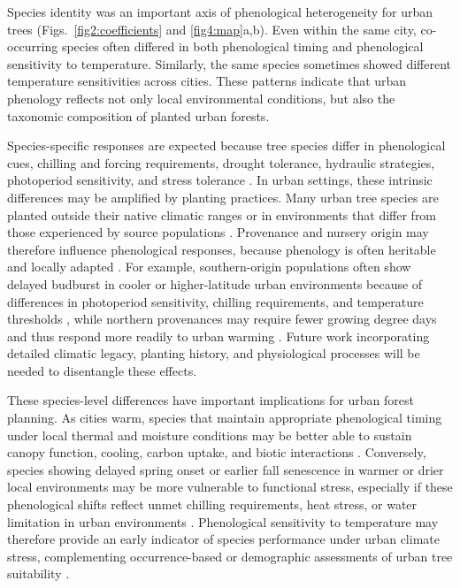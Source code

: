 Species identity was an important axis of phenological heterogeneity for urban trees (Figs.~\ref{fig2:coefficients} and \ref{fig4:map}a,b). Even within the same city, co-occurring species often differed in both phenological timing and phenological sensitivity to temperature. Similarly, the same species sometimes showed different temperature sensitivities across cities. These patterns indicate that urban phenology reflects not only local environmental conditions, but also the taxonomic composition of planted urban forests.

Species-specific responses are expected because tree species differ in phenological cues, chilling and forcing requirements, drought tolerance, hydraulic strategies, photoperiod sensitivity, and stress tolerance \citep{cole_shifting_2017, Wu2025NatCommun}. In urban settings, these intrinsic differences may be amplified by planting practices. Many urban tree species are planted outside their native climatic ranges or in environments that differ from those experienced by source populations \citep{Chamberlain2023CCE, ghelardini_variation_2006, Jensen2022EcolAppl, linkosalo_twilight_2006}. Provenance and nursery origin may therefore influence phenological responses, because phenology is often heritable and locally adapted \citep{Chamberlain2023CCE, Iler2021AREES, Wu2025NatCommun}. For example, southern-origin populations often show delayed budburst in cooler or higher-latitude urban environments because of differences in photoperiod sensitivity, chilling requirements, and temperature thresholds \citep{ghelardini_variation_2006, Jensen2022EcolAppl, linkosalo_twilight_2006}, while northern provenances may require fewer growing degree days and thus respond more readily to urban warming \citep{Chamberlain2023CCE}. Future work incorporating detailed climatic legacy, planting history, and physiological processes will be needed to disentangle these effects.

These species-level differences have important implications for urban forest planning. As cities warm, species that maintain appropriate phenological timing under local thermal and moisture conditions may be better able to sustain canopy function, cooling, carbon uptake, and biotic interactions \citep{Dallimer2016EcolEvol, Ettinger2022NCC,Harrison2015FunctEcol}. Conversely, species showing delayed spring onset or earlier fall senescence in warmer or drier local environments may be more vulnerable to functional stress, especially if these phenological shifts reflect unmet chilling requirements, heat stress, or water limitation in urban environments \citep{Du2022JAG,Zani2020Science}. Phenological sensitivity to temperature may therefore provide an early indicator of species performance under urban climate stress, complementing occurrence-based or demographic assessments of urban tree suitability \citep{Burley2019STOTEN,EsperonRodriguez2022NCC,Wu2025NatCommun,Zhu2025UrbanEcosyst}.

